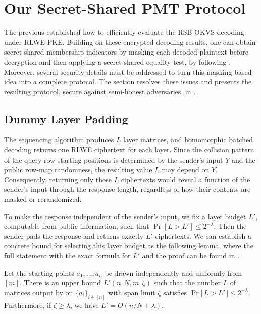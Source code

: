 \section{Our Secret-Shared PMT Protocol} \label{sec:sspmt}
The previous  established how to efficiently evaluate the RSB-OKVS decoding under RLWE-PKE. 
Building on these encrypted decoding results, one can obtain secret-shared membership indicators by masking each decoded plaintext before decryption and then applying a secret-shared equality test, by following .
Moreover, several security details must be addressed to turn this masking-based idea into a complete protocol. 
The section resolves these issues and presents the resulting protocol, secure against semi-honest adversaries, in .


\subsection{Dummy Layer Padding}\label{subsec:dummy-padding}
The sequencing algorithm produces $L$ layer matrices, and homomorphic batched decoding returns one RLWE ciphertext for each layer. Since the collision pattern of the query-row starting positions is determined by the sender's input $Y$ and the public row-map randomness, the resulting value $L$ may depend on $Y$. Consequently, returning only these $L$ ciphertexts would reveal a function of the sender's input through the response length, regardless of how their contents are masked or rerandomized.

To make the response independent of the sender's input, we fix a layer budget $L'$, computable from public information, such that $\Pr[L>L']\leq2^{-\lambda}$. Then the sender pads the response and returns exactly $L'$ ciphertexts. We can establish a concrete bound for selecting this layer budget as the following lemma, where the full statement with the exact formula for $L'$ and the proof can be found in .

\begin{lemma} \label{lemma:Lprime}
    Let the starting points $a_1, \dots, a_n$ be drawn independently and uniformly from $[m]$. There is an upper bound $L'(n, N, m, \zeta)$ such that the number $L$ of matrices output by  on $\{a_i\}_{i \in [n]}$ with span limit $\zeta$ satisfies $\Pr\big[\, L > L' \,\big] \le 2^{-\lambda}$.
    Furthermore, if $\zeta \ge \lambda$, we have $L' = O(n/N+\lambda)$.
\end{lemma}

